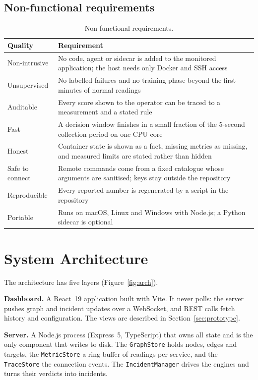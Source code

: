 \subsection{Non-functional requirements}
\begin{table}[!htbp]
\centering
\caption{Non-functional requirements.}
\label{tab:nfr}
\small
\renewcommand{\arraystretch}{1.2}
\begin{tabularx}{\textwidth}{>{\raggedright\arraybackslash}p{3.2cm}>{\raggedright\arraybackslash}X}
\toprule
\textbf{Quality} & \textbf{Requirement}\\
\midrule
Non-intrusive & No code, agent or sidecar is added to the monitored application; the host needs only Docker and SSH access\\
Unsupervised & No labelled failures and no training phase beyond the first minutes of normal readings\\
Auditable & Every score shown to the operator can be traced to a measurement and a stated rule\\
Fast & A decision window finishes in a small fraction of the 5-second collection period on one CPU core\\
Honest & Container state is shown as a fact, missing metrics as missing, and measured limits are stated rather than hidden\\
Safe to connect & Remote commands come from a fixed catalogue whose arguments are sanitised; keys stay outside the repository\\
Reproducible & Every reported number is regenerated by a script in the repository\\
Portable & Runs on macOS, Linux and Windows with Node.js; a Python sidecar is optional\\
\bottomrule
\end{tabularx}
\end{table}

\section{System Architecture}
The architecture has five layers (Figure~\ref{fig:arch}).

\textbf{Dashboard.} A React~19 application built with Vite. It never polls: the server pushes graph and incident updates over a WebSocket, and REST calls fetch history and configuration. The views are described in Section~\ref{sec:prototype}.

\textbf{Server.} A Node.js process (Express~5, TypeScript) that owns all state and is the only component that writes to disk. The \texttt{GraphStore} holds nodes, edges and targets, the \texttt{MetricStore} a ring buffer of readings per service, and the \texttt{TraceStore} the connection events. The \texttt{IncidentManager} drives the engines and turns their verdicts into incidents.

